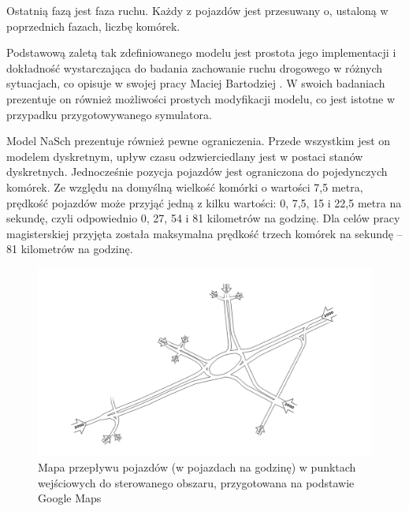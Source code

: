 Ostatnią fazą jest faza ruchu. Każdy z pojazdów jest przesuwany o, ustaloną w poprzednich fazach, liczbę komórek.

Podstawową zaletą tak zdefiniowanego modelu jest prostota jego implementacji i dokładność wystarczająca do badania zachowanie ruchu drogowego w różnych sytuacjach, co opisuje w swojej pracy Maciej Bartodziej \cite{bartodziej}. W swoich badaniach prezentuje on również możliwości prostych modyfikacji modelu, co jest istotne w przypadku przygotowywanego symulatora.

Model NaSch prezentuje również pewne ograniczenia. Przede wszystkim jest on modelem dyskretnym, upływ czasu odzwierciedlany jest w postaci stanów dyskretnych. Jednocześnie pozycja pojazdów jest ograniczona do pojedynczych komórek. Ze względu na domyślną wielkość komórki o wartości 7,5 metra, prędkość pojazdów może przyjąć jedną z kilku wartości: 0, 7,5, 15 i 22,5 metra na sekundę, czyli odpowiednio 0, 27, 54 i 81 kilometrów na godzinę. Dla celów pracy magisterskiej przyjęta została maksymalna prędkość trzech komórek na sekundę -- 81 kilometrów na godzinę.

\begin{figure}[h]
    \centering
    \includegraphics[width=1.0\textwidth]{images/mapa_ruch.png}
    \caption{Mapa przepływu pojazdów (w pojazdach na godzinę) w punktach wejściowych do sterowanego obszaru, przygotowana na podstawie Google Maps \cite{google_maps}}
    \label{fig:mapa_ruch}
\end{figure}

